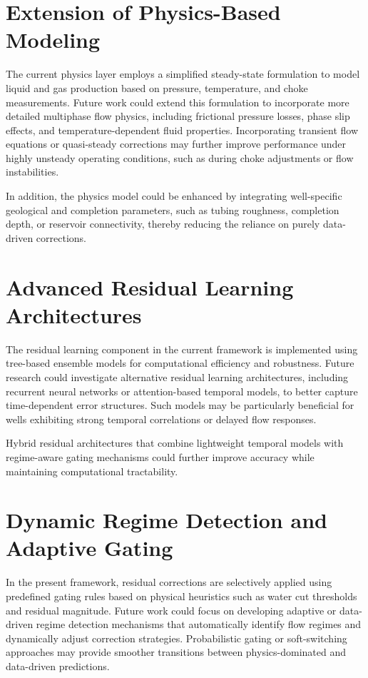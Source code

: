 \documentclass[12pt,APA]{uomthesis}
\begin{document}
\section{Extension of Physics-Based Modeling}
The current physics layer employs a simplified steady-state formulation to model liquid and gas production based on pressure, temperature, and choke measurements. Future work could extend this formulation to incorporate more detailed multiphase flow physics, including frictional pressure losses, phase slip effects, and temperature-dependent fluid properties. Incorporating transient flow equations or quasi-steady corrections may further improve performance under highly unsteady operating conditions, such as during choke adjustments or flow instabilities.

In addition, the physics model could be enhanced by integrating well-specific geological and completion parameters, such as tubing roughness, completion depth, or reservoir connectivity, thereby reducing the reliance on purely data-driven corrections.

\section{Advanced Residual Learning Architectures}
The residual learning component in the current framework is implemented using tree-based ensemble models for computational efficiency and robustness. Future research could investigate alternative residual learning architectures, including recurrent neural networks or attention-based temporal models, to better capture time-dependent error structures. Such models may be particularly beneficial for wells exhibiting strong temporal correlations or delayed flow responses.

Hybrid residual architectures that combine lightweight temporal models with regime-aware gating mechanisms could further improve accuracy while maintaining computational tractability.

\section{Dynamic Regime Detection and Adaptive Gating}
In the present framework, residual corrections are selectively applied using predefined gating rules based on physical heuristics such as water cut thresholds and residual magnitude. Future work could focus on developing adaptive or data-driven regime detection mechanisms that automatically identify flow regimes and dynamically adjust correction strategies. Probabilistic gating or soft-switching approaches may provide smoother transitions between physics-dominated and data-driven predictions.
\end{document}

